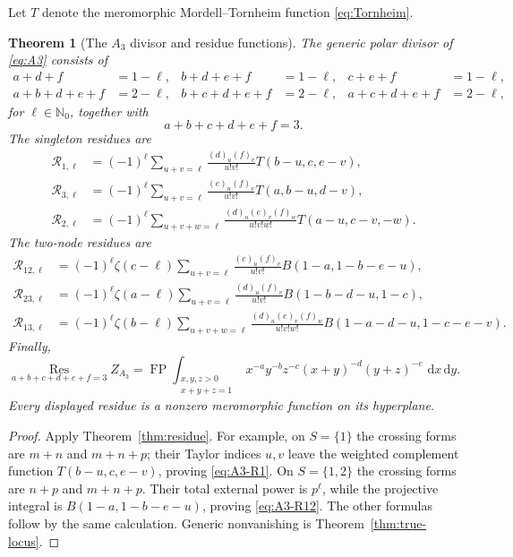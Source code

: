 \documentclass[11pt]{article}
\newtheorem{theorem}{Theorem}[section]
\newcommand{\Nzero}{\mathbb N_0}
\newcommand{\Res}{\operatorname*{Res}}
\newcommand{\FP}{\operatorname*{FP}}
\newcommand{\dd}{\,\mathrm d}
\newcommand{\RF}[2]{(#1)_{#2}}
\newcommand{\cR}{\mathcal R}
\begin{document}
Let $T$ denote the meromorphic Mordell--Tornheim function
\eqref{eq:Tornheim}.

\begin{theorem}[The $A_3$ divisor and residue functions]\label{thm:A3}
The generic polar divisor of \eqref{eq:A3} consists of
\begin{align*}
 a+d+f&=1-\ell,&
 b+d+e+f&=1-\ell,&
 c+e+f&=1-\ell,\\
 a+b+d+e+f&=2-\ell,&
 b+c+d+e+f&=2-\ell,&
 a+c+d+e+f&=2-\ell,
\end{align*}
for $\ell\in\Nzero$, together with
\[
 a+b+c+d+e+f=3.
\]
The singleton residues are
\begin{align}
 \cR_{1,\ell}
 &=(-1)^\ell\!\sum_{u+v=\ell}
   \frac{\RF d u\RF f v}{u!v!}
   T(b-u,c,e-v),\label{eq:A3-R1}\\
 \cR_{3,\ell}
 &=(-1)^\ell\!\sum_{u+v=\ell}
   \frac{\RF e u\RF f v}{u!v!}
   T(a,b-u,d-v),\label{eq:A3-R3}\\
 \cR_{2,\ell}
 &=(-1)^\ell\!\sum_{u+v+w=\ell}
   \frac{\RF d u\RF e v\RF f w}{u!v!w!}
   T(a-u,c-v,-w).
 \label{eq:A3-R2}
\end{align}
The two-node residues are
\begin{align}
 \cR_{12,\ell}
 &=(-1)^\ell\zeta(c-\ell)
   \sum_{u+v=\ell}
   \frac{\RF e u\RF f v}{u!v!}
   B(1-a,1-b-e-u),\label{eq:A3-R12}\\
 \cR_{23,\ell}
 &=(-1)^\ell\zeta(a-\ell)
   \sum_{u+v=\ell}
   \frac{\RF d u\RF f v}{u!v!}
   B(1-b-d-u,1-c),\label{eq:A3-R23}\\
 \cR_{13,\ell}
 &=(-1)^\ell\zeta(b-\ell)
   \sum_{u+v+w=\ell}
   \frac{\RF d u\RF e v\RF f w}{u!v!w!}
   B(1-a-d-u,1-c-e-v).
 \label{eq:A3-R13}
\end{align}
Finally,
\begin{equation}\label{eq:A3-full}
 \Res_{a+b+c+d+e+f=3}Z_{A_3}
 =\FP\!\int_{\substack{x,y,z>0\\x+y+z=1}}
 x^{-a}y^{-b}z^{-c}(x+y)^{-d}(y+z)^{-e}\,\dd x\dd y.
\end{equation}
Every displayed residue is a nonzero meromorphic function on its
hyperplane.
\end{theorem}

\begin{proof}
Apply Theorem~\ref{thm:residue}.  For example, on $S=\{1\}$ the crossing
forms are $m+n$ and $m+n+p$; their Taylor indices $u,v$ leave the
weighted complement function $T(b-u,c,e-v)$, proving
\eqref{eq:A3-R1}.  On $S=\{1,2\}$ the crossing forms are $n+p$ and
$m+n+p$.  Their total external power is $p^\ell$, while the projective
integral is $B(1-a,1-b-e-u)$, proving \eqref{eq:A3-R12}.  The other
formulas follow by the same calculation.  Generic nonvanishing is
Theorem~\ref{thm:true-locus}.
\end{proof}
\end{document}
